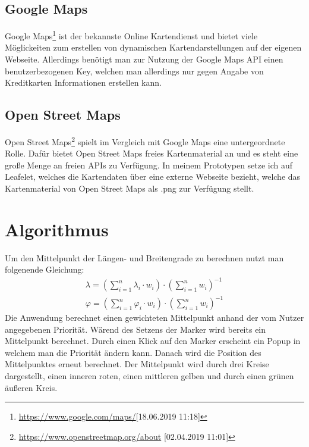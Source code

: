 \documentclass[a4paper, twoside, 12pt]{scrreprt}
\begin{document}
\section{Google Maps}
Google Maps\footnote{\url{https://www.google.com/maps/}[18.06.2019 11:18]} ist der bekannste Online Kartendienst und bietet viele Möglickeiten zum erstellen von dynamischen Kartendarstellungen auf der eigenen Webseite.
Allerdings benötigt man zur Nutzung der Google Maps API einen benutzerbezogenen Key, welchen man allerdings nur gegen Angabe von Kreditkarten Informationen erstellen kann.
\section{Open Street Maps}
Open Street Maps\footnote{\url{https://www.openstreetmap.org/about} [02.04.2019 11:01]} spielt im Vergleich mit Google Maps eine untergeordnete Rolle.
Dafür bietet Open Street Maps freies Kartenmaterial an und es steht eine große Menge an freien APIs zu Verfügung.
In meinem Prototypen setze ich auf Leafelet, welches die Kartendaten über eine externe Webseite bezieht, welche das Kartenmaterial von Open Street Maps als .png zur Verfügung stellt.

\chapter{Algorithmus}
Um den Mittelpunkt der Längen- und Breitengrade zu berechnen nutzt man folgenende Gleichung:
\begin{eqnarray}
\displaystyle
\lambda = \left(\sum_{i=1}^{n}\lambda_i \cdot w_i \right) \cdot \left(\sum_{i=1}^{n} w_i \right)^{-1}\\
\varphi = \left(\sum_{i=1}^{n}\varphi_i \cdot w_i \right) \cdot \left(\sum_{i=1}^{n} w_i \right)^{-1}
\end{eqnarray}
Die Anwendung berechnet einen gewichteten Mittelpunkt anhand der vom Nutzer angegebenen Priorität.
Wärend des Setzens der Marker wird bereits ein Mittelpunkt berechnet.
Durch einen Klick auf den Marker erscheint ein Popup in welchem man die Priorität ändern kann. 
Danach wird die Position des Mittelpunktes erneut berechnet.
Der Mittelpunkt wird durch drei Kreise dargestellt, einen inneren roten, einen mittleren gelben und durch einen grünen äußeren Kreis.
\end{document}

